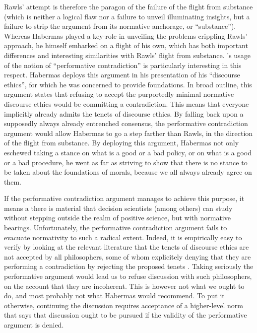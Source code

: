 \documentclass[preprint, french, english, 11pt, authoryear]{elsarticle}%
\begin{document}
Rawls' attempt is therefore the paragon of the failure of the flight from substance (which is neither a logical flaw nor a failure to unveil illuminating insights, but a failure to strip the argument from its normative anchorage, or ``substance''). Whereas Habermas played a key-role in unveiling the problems crippling Rawls' approach, he himself embarked on a flight of his own, which has both important differences and interesting similarities with Rawls' flight from substance. \cite{habermas_moralbewustsein_1983}'s usage of the notion of ``performative contradiction'' is particularly interesting in this respect. Habermas deploys this argument in his presentation of his ``discourse ethics'', for which he was concerned to provide foundations. In broad outline, this argument states that refusing to accept the purportedly minimal normative discourse ethics would be committing a contradiction. This means that everyone implicitly already admits the tenets of discourse ethics. By falling back upon a supposedly always already entrenched consensus, the performative contradiction argument would allow Habermas to go a step farther than Rawls, in the direction of the flight from substance. By deploying this argument, Habermas not only eschewed taking a stance on what is a good or a bad policy, or on what is a good or a bad procedure, he went as far as striving to show that there is no stance to be taken about the foundations of morals, because we all always already agree on them.

If the performative contradiction argument manages to achieve this purpose, it means a there is material that decision scientists (among others) can study without stepping outside the realm of positive science, but with normative bearings. Unfortunately, the performative contradiction argument fails to evacuate normativity to such a radical extent. Indeed, it is empirically easy to verify by looking at the relevant literature that the tenets of discourse ethics are not accepted by all philosophers, some of whom explicitely denying that they are performing a contradiction by rejecting the proposed tenets \citep{heath_communicative_2001}. Taking seriously the performative argument would lead us to refuse discussion with such philosophers, on the account that they are incoherent. This is however not what we ought to do, and most probably not what Habermas would recommend. To put it otherwise, continuing the discussion requires acceptance of a higher-level norm that says that discussion ought to be pursued if the validity of the performative argument is denied.
\end{document}
